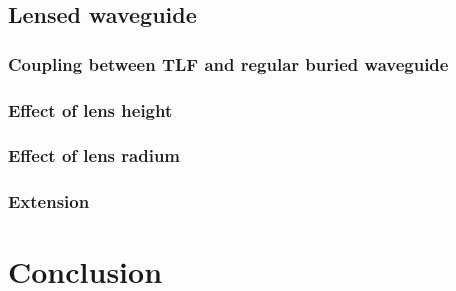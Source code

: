 \section{Lensed waveguide}


\subsection{Coupling between TLF and regular buried waveguide}
\label{sect:optim_lensed_regular}


\subsection{Effect of lens height}

%
\subsection{Effect of lens radium}


\subsection{Extension}
\label{sect:optim_lensed_ext}

%
\chapter{Conclusion}

%



